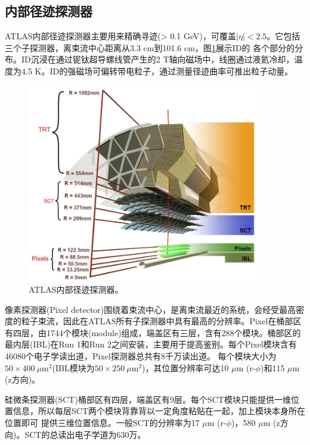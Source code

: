 \subsection{内部径迹探测器}
ATLAS内部径迹探测器主要用来精确寻迹(\pt > 0.1 GeV)，可覆盖$|\eta|<2.5$。它包括三个子探测器，离束流中心距离从3.3 cm到101.6 cm，图\ref{fig:ATLAS_ID_sideview}展示ID的
各个部分的分布。ID沉浸在通过铌钛超导螺线管产生的2 T轴向磁场中，线圈通过液氦冷却，温度为4.5 K。ID的强磁场可偏转带电粒子，通过测量径迹曲率可推出粒子动量。
\begin{figure}[h]
\begin{center}
\includegraphics[width=0.9\textwidth]{fig/ATLAS_ID_sideview.png}
\caption{ATLAS内部径迹探测器。} \label{fig:ATLAS_ID_sideview}
\end{center}
\end{figure}

像素探测器(Pixel detector)围绕着束流中心，是离束流最近的系统，会经受最高密度的粒子束流，因此在ATLAS所有子探测器中具有最高的分辨率。Pixel在桶部区有四层，由1744个模块(module)组成，端盖区有三层，含有288个模块。桶部区的最内层(IBL)在Run 1和Run 2之间安装，主要用于提高\bjet 鉴别。每个Pixel模块含有46080个电子学读出道，Pixel探测器总共有8千万读出道。
每个模块大小为$50\times400~\mu\text{m}^{2}$(IBL模块为$50\times250~\mu\text{m}^{2}$)，其位置分辨率可达10 $\mu\text{m}$ (r-$\phi$)和115 $\mu\text{m}$ (z方向)。

硅微条探测器(SCT)桶部区有四层，端盖区有9层。每个SCT模块只能提供一维位置信息，所以每层SCT两个模块背靠背以一定角度粘贴在一起，加上模块本身所在位置即可
提供三维位置信息。一般SCT的分辨率为17 $\mu\text{m}$ (r-$\phi$)，580 $\mu\text{m}$ (z方向)。SCT的总读出电子学道为630万。

